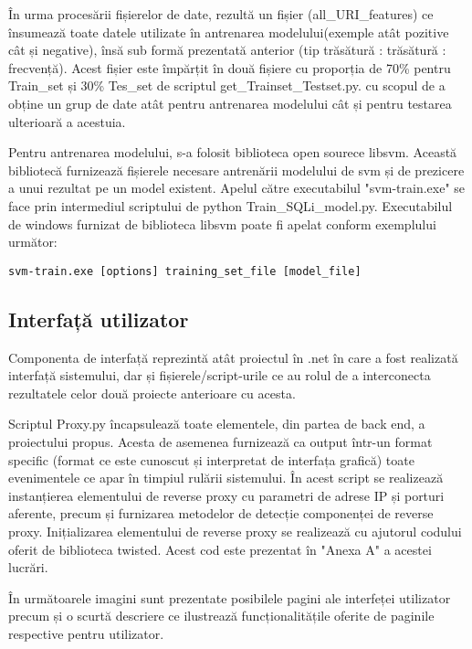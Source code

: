 În urma procesării fișierelor de date, rezultă un fișier  (all\_URI\_features)  ce însumează toate datele utilizate în antrenarea modelului(exemple atât pozitive cât și negative), însă sub formă prezentată anterior (tip trăsătură :  trăsătură : frecvență). Acest fișier este împărțit în două fișiere cu proporția  de 70\% pentru Train\_set și 30\% Tes\_set de scriptul get\_Trainset\_Testset.py.  cu scopul de a obține un grup de date atât pentru antrenarea modelului cât și pentru testarea ulterioară a acestuia. 

Pentru antrenarea modelului, s-a folosit biblioteca open sourece libsvm. Această bibliotecă furnizează fișierele necesare antrenării modelului de svm și de prezicere a unui rezultat pe un model existent. Apelul către executabilul "svm-train.exe" se face prin intermediul scriptului de python  Train\_SQLi\_model.py.
Executabilul de windows furnizat de biblioteca libsvm poate fi apelat conform exemplului următor: 

\begin{lstlisting} 
svm-train.exe [options] training_set_file [model_file]
\end{lstlisting}

\subsection{Interfață utilizator}

 Componenta de interfață reprezintă atât proiectul în .net în care a fost realizată interfață sistemului, dar și fișierele/script-urile ce au rolul de a interconecta rezultatele celor două proiecte anterioare cu acesta. 

Scriptul Proxy.py încapsulează toate elementele, din partea de back end, a proiectului propus. Acesta de asemenea furnizează ca output într-un format specific (format ce este cunoscut și interpretat de interfața grafică) toate evenimentele ce apar în timpiul rulării sistemului. În acest script se realizează instanțierea elementului de reverse proxy cu parametri de adrese IP și porturi aferente, precum și furnizarea metodelor de detecție componenței de reverse proxy. Inițializarea elementului de reverse proxy se realizează cu ajutorul codului oferit de biblioteca twisted. Acest cod este prezentat în "Anexa A" a acestei lucrări. 

În următoarele imagini sunt prezentate posibilele pagini ale interfeței utilizator precum și o scurtă descriere ce ilustrează funcționalitățile oferite de paginile respective pentru utilizator. 

